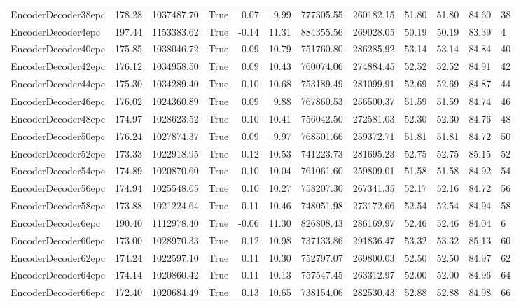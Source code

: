 \begin{tabular}{lrrlrrrrrrrl}
EncoderDecoder38epc & 178.28 & 1037487.70 & True & 0.07 & 9.99 & 777305.55 & 260182.15 & 51.80 & 51.80 & 84.60 & 38 \\
EncoderDecoder4epc & 197.44 & 1153383.62 & True & -0.14 & 11.31 & 884355.56 & 269028.05 & 50.19 & 50.19 & 83.39 & 4 \\
EncoderDecoder40epc & 175.85 & 1038046.72 & True & 0.09 & 10.79 & 751760.80 & 286285.92 & 53.14 & 53.14 & 84.84 & 40 \\
EncoderDecoder42epc & 176.12 & 1034958.50 & True & 0.09 & 10.43 & 760074.06 & 274884.45 & 52.52 & 52.52 & 84.91 & 42 \\
EncoderDecoder44epc & 175.30 & 1034289.40 & True & 0.10 & 10.68 & 753189.49 & 281099.91 & 52.69 & 52.69 & 84.87 & 44 \\
EncoderDecoder46epc & 176.02 & 1024360.89 & True & 0.09 & 9.88 & 767860.53 & 256500.37 & 51.59 & 51.59 & 84.74 & 46 \\
EncoderDecoder48epc & 174.97 & 1028623.52 & True & 0.10 & 10.41 & 756042.50 & 272581.03 & 52.30 & 52.30 & 84.76 & 48 \\
EncoderDecoder50epc & 176.24 & 1027874.37 & True & 0.09 & 9.97 & 768501.66 & 259372.71 & 51.81 & 51.81 & 84.72 & 50 \\
EncoderDecoder52epc & 173.33 & 1022918.95 & True & 0.12 & 10.53 & 741223.73 & 281695.23 & 52.75 & 52.75 & 85.15 & 52 \\
EncoderDecoder54epc & 174.89 & 1020870.60 & True & 0.10 & 10.04 & 761061.60 & 259809.01 & 51.58 & 51.58 & 84.92 & 54 \\
EncoderDecoder56epc & 174.94 & 1025548.65 & True & 0.10 & 10.27 & 758207.30 & 267341.35 & 52.17 & 52.16 & 84.72 & 56 \\
EncoderDecoder58epc & 173.88 & 1021224.64 & True & 0.11 & 10.46 & 748051.98 & 273172.66 & 52.54 & 52.54 & 84.94 & 58 \\
EncoderDecoder6epc & 190.40 & 1112978.40 & True & -0.06 & 11.30 & 826808.43 & 286169.97 & 52.46 & 52.46 & 84.04 & 6 \\
EncoderDecoder60epc & 173.00 & 1028970.33 & True & 0.12 & 10.98 & 737133.86 & 291836.47 & 53.32 & 53.32 & 85.13 & 60 \\
EncoderDecoder62epc & 174.24 & 1022597.10 & True & 0.11 & 10.30 & 752797.07 & 269800.03 & 52.50 & 52.50 & 84.97 & 62 \\
EncoderDecoder64epc & 174.14 & 1020860.42 & True & 0.11 & 10.13 & 757547.45 & 263312.97 & 52.00 & 52.00 & 84.96 & 64 \\
EncoderDecoder66epc & 172.40 & 1020684.49 & True & 0.13 & 10.65 & 738154.06 & 282530.43 & 52.88 & 52.88 & 84.98 & 66 \\

\end{tabular}
